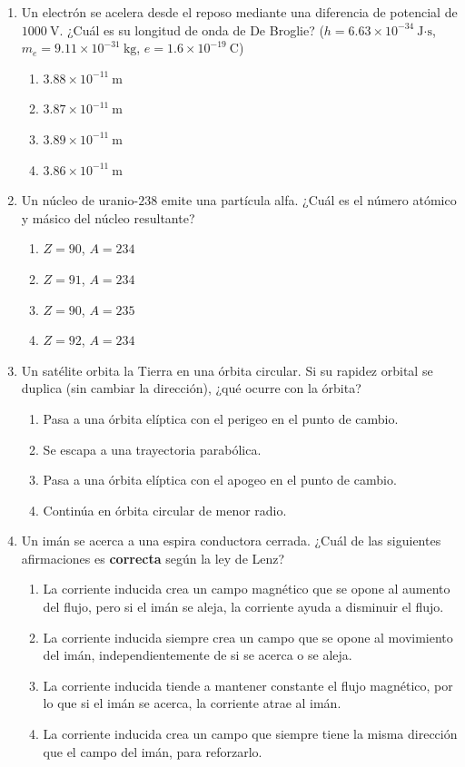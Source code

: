 \documentclass[12pt]{article}
\begin{document}
\begin{enumerate}
\item Un electrón se acelera desde el reposo mediante una diferencia de potencial de $1000\ \text{V}$. ¿Cuál es su longitud de onda de De Broglie? ($h = 6.63\times10^{-34}\ \text{J·s}$, $m_e = 9.11\times10^{-31}\ \text{kg}$, $e = 1.6\times10^{-19}\ \text{C}$)
\begin{enumerate}[label=(\alph*)]
\item $3.88\times10^{-11}\ \text{m}$
\item $3.87\times10^{-11}\ \text{m}$
\item $3.89\times10^{-11}\ \text{m}$
\item $3.86\times10^{-11}\ \text{m}$
\end{enumerate}

\item Un núcleo de uranio-$238$ emite una partícula alfa. ¿Cuál es el número atómico y másico del núcleo resultante?
\begin{enumerate}[label=(\alph*)]
\item $Z=90$, $A=234$
\item $Z=91$, $A=234$
\item $Z=90$, $A=235$
\item $Z=92$, $A=234$
\end{enumerate}

\item Un satélite orbita la Tierra en una órbita circular. Si su rapidez orbital se duplica (sin cambiar la dirección), ¿qué ocurre con la órbita?
\begin{enumerate}[label=(\alph*)]
\item Pasa a una órbita elíptica con el perigeo en el punto de cambio.
\item Se escapa a una trayectoria parabólica.
\item Pasa a una órbita elíptica con el apogeo en el punto de cambio.
\item Continúa en órbita circular de menor radio.
\end{enumerate}

\item Un imán se acerca a una espira conductora cerrada. ¿Cuál de las siguientes afirmaciones es \textbf{correcta} según la ley de Lenz?
\begin{enumerate}[label=(\alph*)]
\item La corriente inducida crea un campo magnético que se opone al aumento del flujo, pero si el imán se aleja, la corriente ayuda a disminuir el flujo.
\item La corriente inducida siempre crea un campo que se opone al movimiento del imán, independientemente de si se acerca o se aleja.
\item La corriente inducida tiende a mantener constante el flujo magnético, por lo que si el imán se acerca, la corriente atrae al imán.
\item La corriente inducida crea un campo que siempre tiene la misma dirección que el campo del imán, para reforzarlo.
\end{enumerate}


\end{enumerate}
\end{document}
